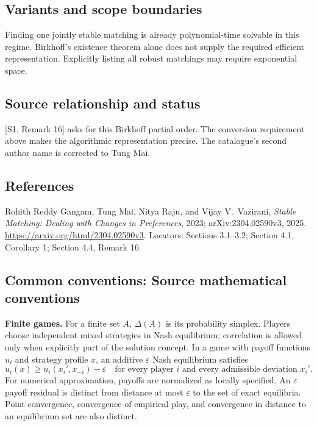 \documentclass[11pt,a4paper]{article}
\begin{document}
\subsection*{Variants and scope boundaries}
Finding one jointly stable matching is already polynomial-time solvable
in this regime. Birkhoff's existence theorem alone does not supply the
required efficient representation. Explicitly listing all robust
matchings may require exponential space.

\subsection*{Source relationship and status}
[S1, Remark 16] asks for this Birkhoff partial order. The conversion
requirement above makes the algorithmic representation precise.
The catalogue's second author name is corrected to Tung Mai.

\subsection*{References}
\begingroup\footnotesize\raggedright
\noindent[S1] Rohith Reddy Gangam, Tung Mai, Nitya Raju, and
Vijay V.~Vazirani,
\emph{Stable Matching: Dealing with Changes in Preferences}, 2023;
arXiv:2304.02590v3, 2025.
\url{https://arxiv.org/html/2304.02590v3}.
Locators: Sections 3.1--3.2; Section 4.1, Corollary 1;
Section 4.4, Remark 16.
\par\endgroup

\subsection*{Common conventions: Source mathematical conventions}

\textbf{Finite games.} For a finite set $A$, $\Delta(A)$ is its probability
simplex. Players choose independent mixed strategies in Nash equilibrium;
correlation is allowed only when explicitly part of the solution concept.
In a game with payoff functions $u_i$ and strategy profile $x$, an additive
$\varepsilon$ Nash equilibrium satisfies
\[
 u_i(x)\geq u_i(x_i',x_{-i})-\varepsilon
 \quad\text{for every player $i$ and every admissible deviation $x_i'$}.
\]
For numerical approximation, payoffs are normalized as locally specified.
An $\varepsilon$ payoff residual is distinct from distance at most
$\varepsilon$ to the set of exact equilibria. Point convergence, convergence
of empirical play, and convergence in distance to an equilibrium set are
also distinct.
\end{document}
